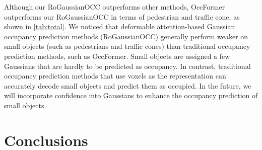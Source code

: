 \documentclass[journal]{IEEEtran}
\begin{document}


Although our RoGaussianOCC outperforms other methods, OccFormer outperforms our RoGaussianOCC in terms of pedestrian and traffic cone, as shown in \autoref{tab:total}.
We noticed that deformable attention-based Gaussian occupancy prediction methods (RoGaussianOCC) generally perform weaker on small objects (such as pedestrians and traffic cones) than traditional occupancy prediction methods, such as OccFormer.
Small objects are assigned a few Gaussians that are hardly to be predicted as occupancy.
In contrast, traditional occupancy prediction methods that use voxels as the representation can accurately decode small objects and predict them as occupied.
In the future, we will incorporate confidence into Gaussians to enhance the occupancy prediction of small objects.  


\section{Conclusions}
\label{sec:conclusions}
\end{document}
